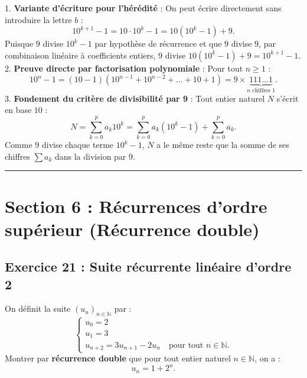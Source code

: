 \documentclass[11pt,a4paper]{article}
\newcommand{\N}{\mathbb{N}}
\begin{document}
\begin{remarquabox}
1. \textbf{Variante d'écriture pour l'hérédité} : On peut écrire directement sans introduire la lettre $b$ :
\[
10^{k+1} - 1 = 10 \cdot 10^k - 1 = 10(10^k - 1) + 9.
\]
Puisque $9$ divise $10^k - 1$ par hypothèse de récurrence et que $9$ divise $9$, par combinaison linéaire à coefficients entiers, $9$ divise $10(10^k - 1) + 9 = 10^{k+1} - 1$.\\
2. \textbf{Preuve directe par factorisation polynomiale} : Pour tout $n \ge 1$ :
\[
10^n - 1 = (10 - 1)\left(10^{n-1} + 10^{n-2} + \dots + 10 + 1\right) = 9 \times \underbrace{111\dots1}_{n \text{ chiffres } 1}.
\]
3. \textbf{Fondement du critère de divisibilité par 9} : Tout entier naturel $N$ s'écrit en base $10$ :
\[
N = \sum_{k=0}^p a_k 10^k = \sum_{k=0}^p a_k (10^k - 1) + \sum_{k=0}^p a_k.
\]
Comme $9$ divise chaque terme $10^k - 1$, $N$ a le même reste que la somme de ses chiffres $\sum a_k$ dans la division par $9$.
\end{remarquabox}

\vspace{1cm}
\hrule
\vspace{1cm}
\section{Section 6 : Récurrences d'ordre supérieur (Récurrence double)}

\subsection*{Exercice 21 : Suite récurrente linéaire d'ordre 2}

On définit la suite $(u_n)_{n \in \N}$ par :
\[
\begin{cases}
u_0 = 2 \\
u_1 = 3 \\
u_{n+2} = 3u_{n+1} - 2u_n \quad \text{pour tout } n \in \N.
\end{cases}
\]
Montrer par \textbf{récurrence double} que pour tout entier naturel $n \in \N$, on a :
\[
u_n = 1 + 2^n.
\]
\end{document}
